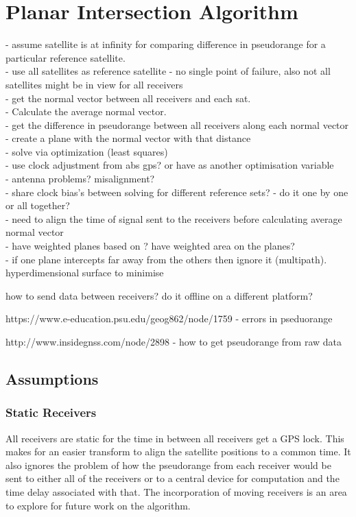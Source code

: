 \section{Planar Intersection Algorithm}

- assume satellite is at infinity for comparing difference in pseudorange for a particular reference satellite.\\
- use all satellites as reference satellite - no single point of failure, also not all satellites might be in view for all receivers\\
- get the normal vector between all receivers and each sat. \\
- Calculate the average normal vector.\\
- get the difference in pseudorange between all receivers along each normal vector \\
- create a plane with the normal vector with that distance\\
- solve via optimization (least squares) \\
- use clock adjustment from abs gps? or have as another optimisation variable\\
- antenna problems? misalignment?\\
- share clock bias's between solving for different reference sets? - do it one by one or all together?\\
- need to align the time of signal sent to the receivers before calculating average normal vector\\

- have weighted planes based on ? have weighted area on the planes?\\
- if one plane intercepts far away from the others then ignore it (multipath). hyperdimensional surface to minimise




how to send data between receivers? do it offline on a different platform?


https://www.e-education.psu.edu/geog862/node/1759 - errors in pseduorange

http://www.insidegnss.com/node/2898 - how to get pseudorange from raw data

\subsection{Assumptions}
\subsubsection{Static Receivers}
All receivers are static for the time in between all receivers get a GPS lock. This makes for an easier transform to align the satellite positions to a common time. It also ignores the problem of how the pseudorange from each receiver would be sent to either all of the receivers or to a central device for computation and the time delay associated with that. The incorporation of moving receivers is an area to explore for future work on the algorithm.

